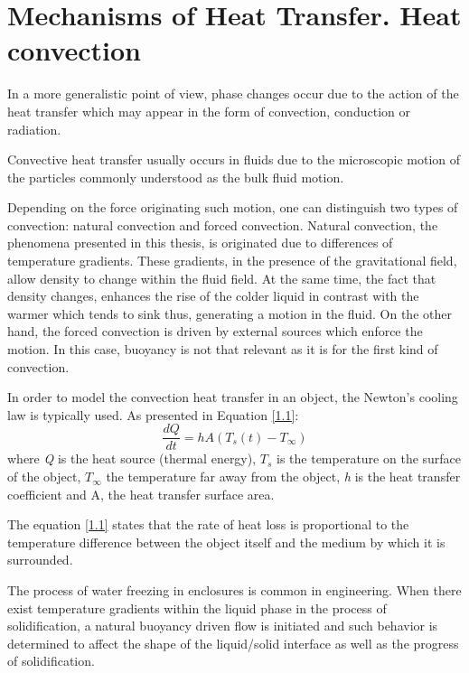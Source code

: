 \section{Mechanisms of Heat Transfer. Heat convection}

\setlength{\parindent}{0.5cm} In a more generalistic point of view, phase changes occur due to the action of the heat transfer which may appear in the form of convection, conduction or radiation. 

\noindent Convective heat transfer usually occurs in fluids due to the microscopic motion of the particles commonly understood as the bulk fluid motion.

\noindent Depending on the force originating such motion, one can distinguish two types of convection: natural convection and forced convection. Natural convection, the phenomena presented in this thesis, is originated due to differences of temperature gradients. These gradients, in the presence of the gravitational field, allow density to change within the fluid field. At the same time, the fact that density changes, enhances the rise of the colder liquid in contrast with the warmer which tends to sink thus, generating a motion in the fluid. On the other hand, the forced convection is driven by external sources which enforce the motion. In this case, buoyancy is not that relevant as it is for the first kind of convection. 

\noindent In order to model the convection heat transfer in an object, the Newton's cooling law is typically used. As presented in Equation \ref{1.1}:
\begin{equation}
\frac{d Q}{d t}=h A\left(T_{s}(t)-T_{\infty}\right)
\label{1.1}
\end{equation}
where \textit{Q} is the heat source (thermal energy), $T_s$ is the temperature on the surface of the object, $T_{\infty}$ the temperature far away from the object, \textit{h} is the heat transfer coefficient and A, the heat transfer surface area.

\noindent The equation \ref{1.1} states that the rate of heat loss is proportional to the temperature difference between the object itself and the medium by which it is surrounded.

\noindent The process of water freezing in enclosures is common in engineering. When there exist temperature gradients within the liquid phase in the process of solidification, a natural buoyancy driven flow is initiated and such behavior is determined to affect the shape of the liquid/solid interface as well as the progress of solidification.

